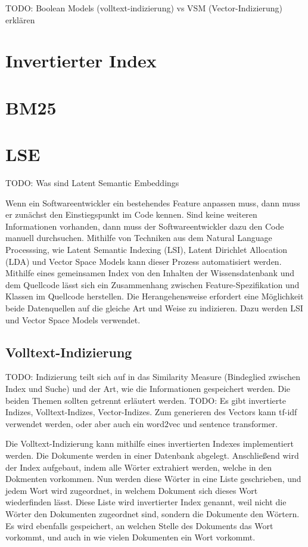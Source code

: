 TODO: Boolean Models (volltext-indizierung) vs VSM (Vector-Indizierung) erklären

\section{Invertierter Index}

\section{BM25}

\section{LSE}
TODO: Was sind Latent Semantic Embeddings

Wenn ein Softwareentwickler ein bestehendes Feature anpassen muss, dann muss er zunächst den Einstiegspunkt im Code kennen.
Sind keine weiteren Informationen vorhanden, dann muss der Softwareentwickler dazu den Code manuell durchsuchen.
Mithilfe von Techniken aus dem Natural Language Processsing, wie Latent Semantic Indexing (LSI), Latent Dirichlet Allocation (LDA) und Vector Space Models kann dieser Prozess automatisiert werden.\cite{Dit_Revelle_Gethers_Poshyvanyk_2011}
Mithilfe eines gemeinsamen Index von den Inhalten der Wissensdatenbank und dem Quellcode lässt sich ein Zusammenhang zwischen Feature-Spezifikation und Klassen im Quellcode herstellen.
Die Herangehensweise erfordert eine Möglichkeit beide Datenquellen auf die gleiche Art und Weise zu indizieren.
Dazu werden LSI und Vector Space Models verwendet.\cite{Antoniol_Canfora_Casazza_DeLucia_2000}

\subsection{Volltext-Indizierung}

TODO: Indizierung teilt sich auf in das Similarity Measure (Bindeglied zwischen Index und Suche) und der Art, wie die Informationen gespeichert werden. Die beiden Themen sollten getrennt erläutert werden.
TODO: Es gibt invertierte Indizes, Volltext-Indizes, Vector-Indizes. Zum generieren des Vectors kann tf-idf verwendet werden, oder aber auch ein word2vec und sentence transformer.

Die Volltext-Indizierung kann mithilfe eines invertierten Indexes implementiert werden.
Die Dokumente werden in einer Datenbank abgelegt.
Anschließend wird der Index aufgebaut, indem alle Wörter extrahiert werden, welche in den Dokmenten vorkommen.
Nun werden diese Wörter in eine Liste geschrieben, und jedem Wort wird zugeordnet, in welchem Dokument sich dieses Wort wiederfinden lässt.
Diese Liste wird invertierter Index genannt, weil nicht die Wörter den Dokumenten zugeordnet sind, sondern die Dokumente den Wörtern.
Es wird ebenfalls gespeichert, an welchen Stelle des Dokuments das Wort vorkommt, und auch in wie vielen Dokumenten ein Wort vorkommt.\\


